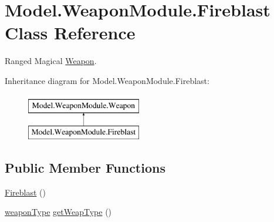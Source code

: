 \hypertarget{class_model_1_1_weapon_module_1_1_fireblast}{}\section{Model.\+Weapon\+Module.\+Fireblast Class Reference}
\label{class_model_1_1_weapon_module_1_1_fireblast}


Ranged Magical \hyperlink{interface_model_1_1_weapon_module_1_1_weapon}{Weapon}.  


Inheritance diagram for Model.\+Weapon\+Module.\+Fireblast\+:\begin{figure}[H]
\begin{center}
\leavevmode
\includegraphics[height=2.000000cm]{class_model_1_1_weapon_module_1_1_fireblast}
\end{center}
\end{figure}
\subsection*{Public Member Functions}
\begin{DoxyCompactItemize}
\item 
\hyperlink{class_model_1_1_weapon_module_1_1_fireblast_ad225a3a6bf2366ae5d431e775b0f8396}{Fireblast} ()
\item 
\hyperlink{namespace_model_1_1_weapon_module_a3390c266f89e3399c2bc7fa31f13cbec}{weapon\+Type} \hyperlink{class_model_1_1_weapon_module_1_1_fireblast_a90f93c7c190cf7e7d1b55b48b56face9}{get\+Weap\+Type} ()
\end{DoxyCompactItemize}
